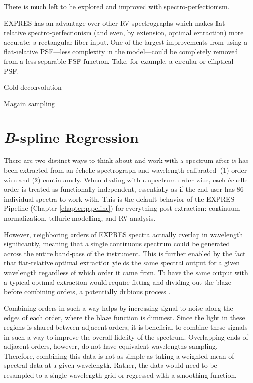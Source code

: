 There is much left to be explored and improved with spectro-perfectionism.

EXPRES has an advantage over other RV spectrographs which makes flat-relative spectro-perfectionism (and even, by extension, optimal extraction) more accurate: a rectangular fiber input. One of the largest improvements from using a flat-relative PSF---less complexity in the model---could be completely removed from a less separable PSF function. Take, for example, a circular or elliptical PSF. 

Gold deconvolution

Magain sampling

\section{\textit{B}-spline Regression} \label{pipeline2:bspline}

There are two distinct ways to think about and work with a spectrum after it has been extracted from an \'{e}chelle spectrograph and wavelength calibrated: (1) order-wise and (2) continuously. When dealing with a spectrum order-wise, each \'{e}chelle order is treated as functionally independent, essentially as if the end-user has 86 individual spectra to work with. This is the default behavior of the EXPRES Pipeline (Chapter \ref{chapter:pipeline}) for everything post-extraction: continuum normalization, telluric modelling, and RV analysis.

However, neighboring orders of EXPRES spectra actually overlap in wavelength significantly, meaning that a single continuous spectrum could be generated across the entire band-pass of the instrument. This is further enabled by the fact that flat-relative optimal extraction yields the same spectral output for a given wavelength regardless of which order it came from. To have the same output with a typical optimal extraction would require fitting and dividing out the blaze before combining orders, a potentially dubious process \citep{xu_modeling_2019}.

Combining orders in such a way helps by increasing signal-to-noise along the edges of each order, where the blaze function is dimmest. Since the light in these regions is shared between adjacent orders, it is beneficial to combine these signals in such a way to improve the overall fidelity of the spectrum. Overlapping ends of adjacent orders, however, do not have equivalent wavelengths sampling. Therefore, combining this data is not as simple as taking a weighted mean of spectral data at a given wavelength. Rather, the data would need to be resampled to a single wavelength grid \citep{anglada-escude_harps-terra_2012} or regressed with a smoothing function.


